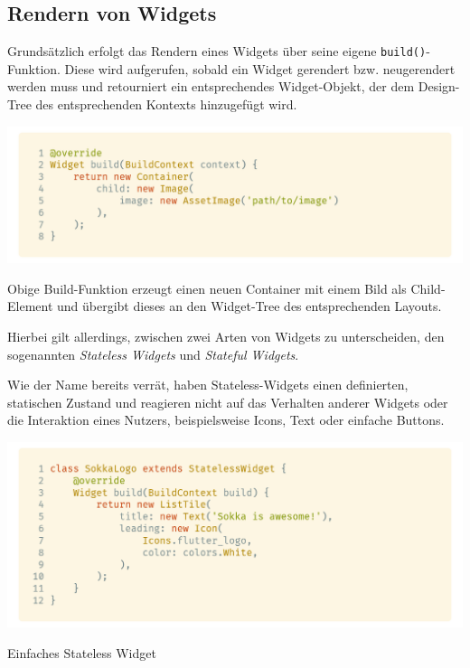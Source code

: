 
\subsection{Rendern von Widgets}

Grundsätzlich erfolgt das Rendern eines Widgets über seine eigene \lstinline{build()}-Funktion. Diese wird aufgerufen,
sobald ein Widget gerendert bzw. neugerendert werden muss und retourniert ein entsprechendes Widget-Objekt,
der dem Design-Tree des entsprechenden Kontexts hinzugefügt wird.

\begin{code}
    \centering
    \includegraphics[width=1\textwidth]{images/Flutter/flutterBuildFunction.png}
    \vspace{-25pt}
    \caption{\lstinline{build()}-Funktion eines Widgets}
\end{code}

Obige Build-Funktion erzeugt einen neuen Container mit einem Bild als Child-Element und übergibt dieses
an den Widget-Tree des entsprechenden Layouts.

Hierbei gilt allerdings, zwischen zwei Arten von Widgets zu unterscheiden, den sogenannten \textit{Stateless Widgets}
und \textit{Stateful Widgets}.

Wie der Name bereits verrät, haben Stateless-Widgets einen definierten, statischen Zustand und reagieren nicht
auf das Verhalten anderer Widgets oder die Interaktion eines Nutzers, beispielsweise Icons, Text oder einfache
Buttons.

\begin{code}
    \centering
    \includegraphics[width=1\textwidth]{images/Flutter/flutterStatelessWidget.png}
    \vspace{-25pt}
    \caption{Einfaches Stateless Widget}
\end{code}

